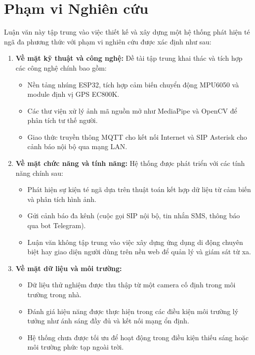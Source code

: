 \section{Phạm vi Nghiên cứu}

Luận văn này tập trung vào việc thiết kế và xây dựng một hệ thống phát hiện té ngã đa phương thức với phạm vi nghiên cứu được xác định như sau:

\begin{enumerate}
    \item \textbf{Về mặt kỹ thuật và công nghệ:} Đề tài tập trung khai thác và tích hợp các công nghệ chính bao gồm:
    \begin{itemize}
        \item Nền tảng nhúng ESP32, tích hợp cảm biến chuyển động MPU6050 và module định vị GPS EC800K.
        \item Các thư viện xử lý ảnh mã nguồn mở như MediaPipe và OpenCV để phân tích tư thế người.
        \item Giao thức truyền thông MQTT cho kết nối Internet và SIP Asterisk cho cảnh báo nội bộ qua mạng LAN.
    \end{itemize}

    \item \textbf{Về mặt chức năng và tính năng:} Hệ thống được phát triển với các tính năng chính sau:
    \begin{itemize}
        \item Phát hiện sự kiện té ngã dựa trên thuật toán kết hợp dữ liệu từ cảm biến và phân tích hình ảnh.
        \item Gửi cảnh báo đa kênh (cuộc gọi SIP nội bộ, tin nhắn SMS, thông báo qua bot Telegram).
        \item Luận văn không tập trung vào việc xây dựng ứng dụng di động chuyên biệt hay giao diện người dùng trên nền web để quản lý và giám sát từ xa.
    \end{itemize}

    \item \textbf{Về mặt dữ liệu và môi trường:}
    \begin{itemize}
        \item Dữ liệu thử nghiệm được thu thập từ một camera cố định trong môi trường trong nhà.
        \item Đánh giá hiệu năng được thực hiện trong các điều kiện môi trường lý tưởng như ánh sáng đầy đủ và kết nối mạng ổn định.
        \item Hệ thống chưa được tối ưu để hoạt động trong điều kiện thiếu sáng hoặc môi trường phức tạp ngoài trời.
    \end{itemize}
\end{enumerate}
